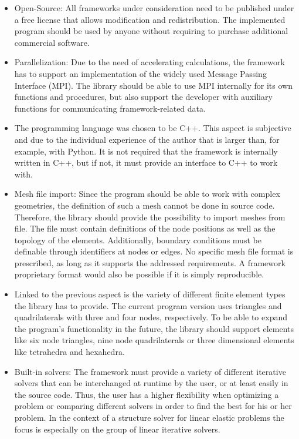  \begin{itemize}
  \item Open-Source: All frameworks under consideration need to be published under a free license that allows modification and redistribution. The implemented program should be used by anyone without requiring to purchase additional commercial software.
  
  \item Parallelization: Due to the need of accelerating calculations, the framework has to support an implementation of the widely used Message Passing Interface (MPI). The library should be able to use MPI internally for its own functions and procedures, but also support the developer with auxiliary functions for communicating framework-related data.
 
  \item The programming language was chosen to be C++. This aspect is subjective and due to the individual experience of the author that is larger than, for example, with Python. It is not required that the framework is internally written in C++, but if not, it must provide an interface to C++ to work with.
 
  \item Mesh file import: Since the program should be able to work with complex geometries, the definition of such a mesh cannot be done in source code. Therefore, the library should provide the possibility to import meshes from file. The file must contain definitions of the node positions as well as the topology of the elements. Additionally, boundary conditions must be definable through identifiers at nodes or edges. No specific mesh file format is prescribed, as long as it supports the addressed requirements. A framework proprietary format would also be possible if it is simply reproducible.
  
  \item Linked to the previous aspect is the variety of different finite element types the library has to provide. The current program version uses triangles and quadrilaterals with three and four nodes, respectively. To be able to expand the program's functionality in the future, the library should support elements like six node triangles, nine node quadrilaterals or three dimensional elements like tetrahedra and hexahedra.
  
  \item Built-in solvers: The framework must provide a variety of different iterative solvers that can be interchanged at runtime by the user, or at least easily in the source code. Thus, the user has a higher flexibility when optimizing a problem or comparing different solvers in order to find the best for his or her problem. In the context of a structure solver for linear elastic problems the focus is especially on the group of linear iterative solvers.
 

\end{itemize}
